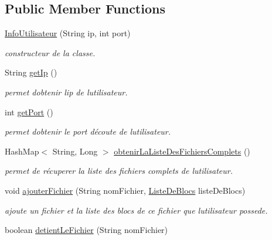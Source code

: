 \subsection*{Public Member Functions}
\begin{DoxyCompactItemize}
\item 
\hyperlink{classcommun_1_1InfoUtilisateur_aaa6fb8bb0211678aad4fe5343d36485e}{Info\+Utilisateur} (String ip, int port)
\begin{DoxyCompactList}\small\item\em constructeur de la classe. \end{DoxyCompactList}\item 
String \hyperlink{classcommun_1_1InfoUtilisateur_acdf31d84ce570faa468b6bae8416e998}{get\+Ip} ()
\begin{DoxyCompactList}\small\item\em permet d\textquotesingle{}obtenir l\textquotesingle{}ip de l\textquotesingle{}utilisateur. \end{DoxyCompactList}\item 
int \hyperlink{classcommun_1_1InfoUtilisateur_a534d959e66e5495fb67f4289573d7be9}{get\+Port} ()
\begin{DoxyCompactList}\small\item\em permet d\textquotesingle{}obtenir le port d\textquotesingle{}écoute de l\textquotesingle{}utilisateur. \end{DoxyCompactList}\item 
Hash\+Map$<$ String, Long $>$ \hyperlink{classcommun_1_1InfoUtilisateur_a792f0a8d202c280ca41da46151265dea}{obtenir\+La\+Liste\+Des\+Fichiers\+Complets} ()
\begin{DoxyCompactList}\small\item\em permet de récuperer la liste des fichiers complets de l\textquotesingle{}utilisateur. \end{DoxyCompactList}\item 
void \hyperlink{classcommun_1_1InfoUtilisateur_a49464d9eecf82d8768449eabc848aa39}{ajouter\+Fichier} (String nom\+Fichier, \hyperlink{classcommun_1_1ListeDeBlocs}{Liste\+De\+Blocs} liste\+De\+Blocs)
\begin{DoxyCompactList}\small\item\em ajoute un fichier et la liste des blocs de ce fichier que l\textquotesingle{}utilisateur possede. \end{DoxyCompactList}\item 
boolean \hyperlink{classcommun_1_1InfoUtilisateur_ab120b90f5b5cf07fc6ebc9b34488e3b3}{detient\+Le\+Fichier} (String nom\+Fichier)

\end{DoxyCompactItemize}
